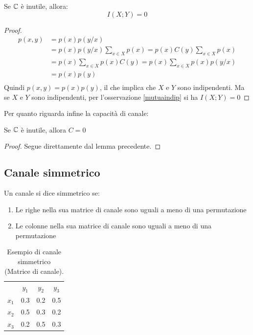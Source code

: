 \begin{lemma}
 Se $\mathbb{C}$ è inutile, allora:
\[
  I(X;Y)=0
\]
 \begin{proof}
\[\begin{split}
 p(x,y)&=p(x)p(y/x) \\
       &=p(x)p(y/x)\sum_{x \in X}p(x) 
       =p(x)C(y)\sum_{x \in X}p(x) \\
       &=p(x) \sum_{x \in X}p(x)C(y)
       =p(x) \sum_{x \in X}p(x)p(y/x)\\
       &=p(x) p(y) \\
  \end{split}
\]
Quindi $p(x,y)=p(x)p(y)$, il che implica che $X$ e $Y$ sono indipendenti.
Ma se $X$ e $Y$ sono indipendenti, per l'osservazione \ref{mutuaindip} si ha $I(X;Y)=0$
 \end{proof}
\end{lemma}

\noindent
Per quanto riguarda infine la capacità di canale:

\begin{lemma}
Se $\mathbb{C}$ è inutile, allora $C=0$
\begin{proof}
Segue direttamente dal lemma precedente.
\end{proof}
\end{lemma}

\subsection{Canale simmetrico}

\medskip

\begin{definizione}
 Un canale si dice simmetrico se:
 \begin{enumerate}
  \item Le righe nella sua matrice di canale sono uguali a meno di una permutazione
  \item Le colonne nella sua matrice di canale sono uguali a meno di una permutazione
 \end{enumerate}
\end{definizione}


\begin{table}[htbp]
  \begin{center}
   \begin{tabular}{c c c c}
	& $y_1$ & $y_2$ & $y_3$ \\
	$x_1$ & 0.3 & 0.2 & 0.5 \\ 
	$x_2$ & 0.5 & 0.3 & 0.2  \\ 
	$x_3$ & 0.2 & 0.5 & 0.3  \\ 
    \end{tabular}
  \caption{Esempio di canale simmetrico (Matrice di canale).}
  \label{tab:tsim}
  \end{center}
\end{table}

